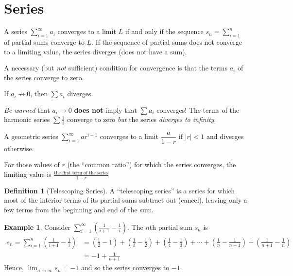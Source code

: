 \documentclass[12pt,letterpaper,fleqn]{article}
\newcommand{\ds}{\displaystyle}
\theoremstyle{definition}
\newtheorem*{definition}{Definition}
\theoremstyle{defintion}
\newtheorem*{exmp}{Example}
\begin{document}
\section*{Series}
  A series $\sum_{i=1}^\infty a_i$ converges to a limit $L$ if and only if the sequence $s_n = \sum_{i=1}^n$ of partial sums converge to $L$. If the sequence of partial sums does not converge to a limiting value, the series diverges (does not have a sum).

  A necessary (but \emph{not} sufficient) condition for convergence is that the terms $a_i$ of the series converge to zero.

   If $a_i \not\to 0$, then $\sum a_i$ diverges.

  \emph{Be warned} that $a_i \to 0$ {\bf does not} imply that $\sum a_i$ converges! The terms of the harmonic series $\sum \frac{1}{i}$ converge to zero \emph{but} the series \emph{diverges to infinity}.

   A geometric series $\sum_{i=1}^\infty ar^{i-1}$ converges to a limit $\dfrac{a}{1-r}$ if $|r| < 1$ and diverges otherwise.

  For those values of $r$ (the ``common ratio'') for which the series converges, the limiting value is $\frac{\text{the first term of the series}}{1 - r}$

  \theoremstyle{definition}
  \begin{definition}[Telescoping Series]
    A ``telescoping series'' is a series for which most of the interior terms of its partial sums subtract out (cancel), leaving only a few terms from the beginning and end of the sum.
  \end{definition}
  \begin{exmp}
    Consider $\ds\sum_{i=1}^\infty \left(\frac{1}{i+1} - \frac{1}{i}\right)$. The $n$th partial sum $s_n$ is
    \begin{align*}
      s_n = \sum_{i=1}^n \left(\frac{1}{i+1} - \frac{1}{i}\right) &= \left(\frac{1}{2} - 1\right) + \left(\frac{1}{3} - \frac{1}{2}\right) + \left(\frac{1}{4} - \frac{1}{3}\right) +\cdots + \left(\frac{1}{n} - \frac{1}{n-1}\right) + \left(\frac{1}{n+1} - \frac{1}{n}\right)\\
      &= -1 + \frac{1}{n+1}
    \end{align*} Hence, $\lim_{n\to\infty} s_n = -1$ and so the series converges to $-1$.
  \end{exmp}
\end{document}
